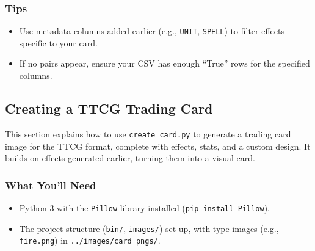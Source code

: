 \subsubsection{Tips}
\begin{itemize}
	\item Use metadata columns added earlier (e.g., \texttt{UNIT}, \texttt{SPELL}) to filter effects specific to your card.
	\item If no pairs appear, ensure your CSV has enough ``True'' rows for the specified columns.
\end{itemize}














\subsection{Creating a TTCG Trading Card}

This section explains how to use \texttt{create\_card.py} to generate a trading card image for the TTCG format, complete with effects, stats, and a custom design. It builds on effects generated earlier, turning them into a visual card.

\subsubsection{What You’ll Need}
\begin{itemize}
	\item Python 3 with the \texttt{Pillow} library installed (\texttt{pip install Pillow}).
	\item The project structure (\texttt{bin/}, \texttt{images/}) set up, with type images (e.g., \texttt{fire.png}) in \texttt{../images/card pngs/}.
\end{itemize}

